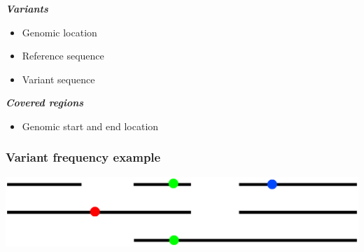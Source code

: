 \documentclass[slidestop]{beamer}
\begin{document}
\begin{frame}[fragile]
  {\bf \it Variants}
  \begin{itemize}
    \item Genomic location
    \item Reference sequence
    \item Variant sequence
  \end{itemize}
  \vspace{0.8cm}
  {\bf \it Covered regions}
  \begin{itemize}
    \item Genomic start and end location
  \end{itemize}
  \vspace{0.2cm}
  \begin{center}
  \end{center}
\end{frame}

\begin{frame}
  \frametitle{Variant frequency example}
  \begin{center}
    \includegraphics[width=\textwidth]{frequencies}
  \end{center}
\end{frame}
\end{document}
